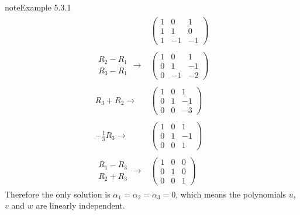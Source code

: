\documentclass[letterpaper,10pt,english]{jupyterBook}
\begin{document}
\begin{sphinxadmonition}{note}{Example 5.3.1}
\begin{equation*}
\begin{split}
\begin{align*}
    & \left( \begin{array}{ccc}
        1 & 0 & 1\\
        1 & 1 & 0\\
        1 & -1 & -1
    \end{array} \right)
    \\ \\
    \begin{matrix} R_2 - R_1 \\ R_3 - R_1 \end{matrix} \longrightarrow  &
    \left( \begin{array}{ccc}
        1 & 0 & 1\\
        0 & 1 & -1\\
        0 & -1 & -2
    \end{array} \right)
    \\ \\
    R_3 + R_2\longrightarrow  &
    \left( \begin{array}{ccc}
        1 & 0 & 1\\
        0 & 1 & -1\\
        0 & 0 & -3
    \end{array} \right)
	\\ \\
    -\frac{1}{3}R_3\longrightarrow &
    \left( \begin{array}{ccc}
        1 & 0 & 1\\
        0 & 1 & -1\\
        0 & 0 & 1
    \end{array} \right)
    \\ \\
    \begin{matrix} R_1 - R_3 \\ R_2 + R_3 \end{matrix}\longrightarrow  &
    \left( \begin{array}{ccc}
        1 & 0 & 0\\
        0 & 1 & 0\\
        0 & 0 & 1
    \end{array} \right)
\end{align*} \end{split}
\end{equation*}
\sphinxAtStartPar
Therefore the only solution is \(\alpha_1 = \alpha_2 = \alpha_3 = 0\), which means the polynomials \(u\), \(v\) and \(w\) are linearly independent.
\end{sphinxadmonition}
\end{document}
